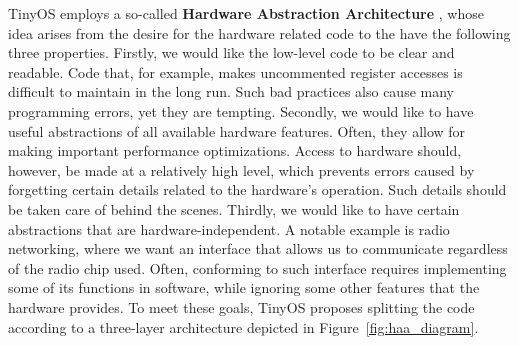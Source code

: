 TinyOS employs a so-called {\bf Hardware Abstraction Architecture} \cite{TEP2}, whose idea arises from the desire for the hardware related code to the have the following three properties. Firstly, we would like the low-level code to be clear and readable. Code that, for example, makes uncommented register accesses is difficult to maintain in the long run. Such bad practices also cause many programming errors, yet they are tempting. Secondly, we would like to have useful abstractions of all available hardware features. Often, they allow for making important performance optimizations. Access to hardware should, however, be made at a relatively high level, which prevents errors caused by forgetting certain details related to the hardware's operation. Such details should be taken care of behind the scenes. Thirdly, we would like to have certain abstractions that are hardware-independent. A notable example is radio networking, where we want an interface that allows us to communicate regardless of the radio chip used. Often, conforming to such interface requires implementing some of its functions in software, while ignoring some other features that the hardware provides. To meet these goals, TinyOS proposes splitting the code according to a three-layer architecture depicted in Figure~\ref{fig:haa_diagram}.
